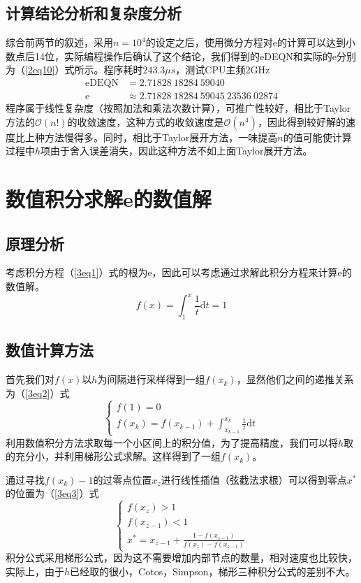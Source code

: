 \documentclass[onecolumn,compsoc]{IEEEtran}
\renewcommand{\d}{\mathrm{d}}
\renewcommand{\|}{\Bigg |}
\newcommand{\e}{\mathrm{e}}
\begin{document}
\subsection{计算结论分析和复杂度分析}
综合前两节的叙述，采用$n =  10^4$的设定之后，使用微分方程对e的计算可以达到小数点后14位，实际编程操作后确认了这个结论，我们得到的eDEQN和实际的e分别为（\ref{2eq10}）式所示。程序耗时$243.3\mu s$，测试CPU主频2GHz
\begin{equation}\label{2eq10}\begin{aligned}
\mathrm{eDEQN} &= 2.71828\ 18284\ 59040 \\ 
\e &\approx 2.71828\ 18284\ 59045\ 23536\ 02874 
\end{aligned}\end{equation}
程序属于线性复杂度（按照加法和乘法次数计算），可推广性较好，相比于Taylor方法的$\mathcal{O}(n!)$的收敛速度，这种方式的收敛速度是$\mathcal{O}(n^4)$，因此得到较好解的速度比上种方法慢得多。同时，相比于Taylor展开方法，一味提高$n$的值可能使计算过程中$h$项由于舍入误差消失，因此这种方法不如上面Taylor展开方法。
\section{数值积分求解e的数值解}
\subsection{原理分析}
考虑积分方程（\ref{3eq1}）式的根为e，因此可以考虑通过求解此积分方程来计算e的数值解。
\begin{equation}\label{3eq1}
f(x) = \int_1^x\frac{1}{t}\d t = 1
\end{equation}
\subsection{数值计算方法}
首先我们对$f(x)$以$h$为间隔进行采样得到一组$f(x_k)$，显然他们之间的递推关系为（\ref{3eq2}）式
\begin{equation}\label{3eq2}\begin{cases}
f(1) = 0\\
f(x_k) = f(x_{k-1}) + \int_{x_{k-1}}^{x_k}\frac{1}{t}\d t
\end{cases}\end{equation}
利用数值积分方法求取每一个小区间上的积分值，为了提高精度，我们可以将$h$取的充分小，并利用梯形公式求解。这样得到了一组$f(x_k)$。

通过寻找$f(x_k)-1$的过零点位置$x_z$进行线性插值（弦截法求根）可以得到零点$x^*$的位置为（\ref{3eq3}）式
\begin{equation}\label{3eq3}\begin{cases}
f(x_z) > 1\\
f(x_{z-1}) < 1\\
x^* = x_{z-1} + \frac{1-f(x_{z-1})}{f(x_z)-f(x_{z-1})}
\end{cases}\end{equation}
积分公式采用梯形公式，因为这不需要增加内部节点的数量，相对速度也比较快，实际上，由于$h$已经取的很小，Cotos，Simpson，梯形三种积分公式的差别不大。
\end{document}
